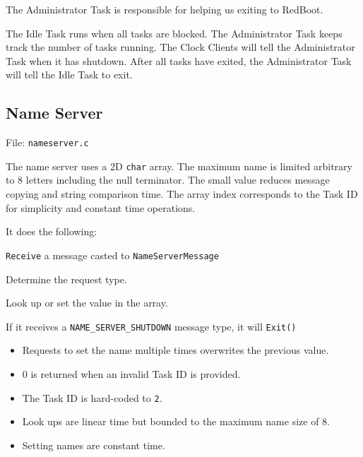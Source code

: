 \documentclass[letterpaper]{article}
\begin{document}
The Administrator Task is responsible for helping us exiting to RedBoot.

The Idle Task runs when all tasks are blocked. The Administrator Task keeps track the number of tasks running. The Clock Clients will tell the Administrator Task when it has shutdown. After all tasks have exited, the Administrator Task will tell the Idle Task to exit.


\subsection{Name Server%
  \label{name-server}%
}

File: \texttt{nameserver.c}

The name server uses a 2D \texttt{char} array. The maximum name is limited arbitrary to 8 letters including the null terminator. The small value reduces message copying and string comparison time. The array index corresponds to the Task ID for simplicity and constant time operations.

It does the following:
\setcounter{listcnt0}{0}
\begin{list}{.}
{
\setlength{\rightmargin}{\leftmargin}
}

\item \texttt{Receive} a message casted to \texttt{NameServerMessage}

\item Determine the request type.

\item Look up or set the value in the array.

\item If it receives a \texttt{NAME\_SERVER\_SHUTDOWN} message type, it will \texttt{Exit()}
\end{list}
%
\begin{itemize}

\item Requests to set the name multiple times overwrites the previous value.

\item 0 is returned when an invalid Task ID is provided.

\item The Task ID is hard-coded to \texttt{2}.

\item Look ups are linear time but bounded to the maximum name size of 8.

\item Setting names are constant time.

\end{itemize}
\end{document}
